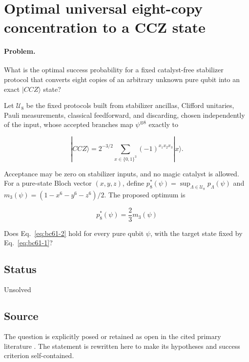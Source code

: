 \section{Optimal universal eight-copy concentration to a CCZ state}
\label{sec:op_bc61eaba5c332fec}

\paragraph{Problem.}
What is the optimal success probability for a fixed catalyst-free stabilizer protocol that converts eight copies of an arbitrary unknown pure qubit into an exact $|CCZ\rangle$ state?

Let $\mathcal U_8$ be the fixed protocols built from stabilizer ancillas, Clifford unitaries, Pauli measurements, classical feedforward, and discarding, chosen independently of the input, whose accepted branches map $\psi^{\otimes8}$ exactly to

\begin{equation}
|CCZ\rangle=2^{-3/2}\sum_{x\in\{0,1\}^3}(-1)^{x_1x_2x_3}|x\rangle.
\label{eq:bc61-1}
\end{equation}

Acceptance may be zero on stabilizer inputs, and no magic catalyst is allowed. For a pure-state Bloch vector $(x,y,z)$, define $p_8^*(\psi)=\sup_{\Lambda\in\mathcal U_8}p_\Lambda(\psi)$ and $m_3(\psi)=(1-x^6-y^6-z^6)/2$. The proposed optimum is

\begin{equation}
p_8^*(\psi)=\frac23m_3(\psi)
\label{eq:bc61-2}
\end{equation}

Does Eq.~\eqref{eq:bc61-2} hold for every pure qubit $\psi$, with the target state fixed by Eq.~\eqref{eq:bc61-1}?

\subsection*{Status}

Unsolved

\subsection*{Source}

The question is explicitly posed or retained as open in the cited primary literature .  The statement is rewritten here to make its hypotheses and success criterion self-contained.

